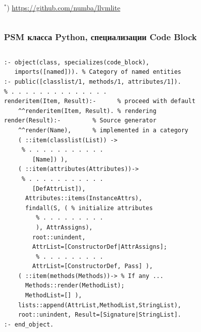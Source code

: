 \documentclass[10pt]{beamer}
\begin{document}
\begin{frame}[fragile]
\begin{columns}
\begin{column}{0.4\textwidth}
  ${}^*$) \url{https://github.com/numba/llvmlite}
    \end{column}
  \end{columns}
 \end{frame}

\begin{frame}[fragile] \frametitle{PSM класса Python, специализации Code Block}

\begin{columns} \begin{column}{0.6\textwidth} \flushleft

\begin{verbatim}
:- object(class, specializes(code_block),
   imports([named])). % Category of named entities
:- public([classlist/1, methods/1, attributes/1]).
% . . . . . . . . . . . . . .
renderitem(Item, Result):-      % proceed with default
    ^^renderitem(Item, Result). % rendering
render(Result):-         % Source generator
    ^^render(Name),      % implemented in a category
    ( ::item(classlist(List)) ->
     % . . . . . . . . . . .
        [Name]) ),
    ( ::item(attributes(Attributes))->
     % . . . . . . . . . . .
        [DefAttrList]),
      Attributes::items(InstanceAttrs),
      findall(S, ( % initialize attributes
         % . . . . . . . . .
         ), AttrAssigns),
        root::unindent,
        AttrList=[ConstructorDef|AttrAssigns];
         % . . . . . . . . .
        AttrList=[ConstructorDef, Pass] ),
    ( ::item(methods(Methods))-> % If any ...
      Methods::render(MethodList);
      MethodList=[] ),
    lists::append(AttrList,MethodList,StringList),
    root::unindent, Result=[Signature|StringList].
:- end_object.
\end{verbatim}

\end{column}
\end{columns}
\end{frame}
\end{document}
